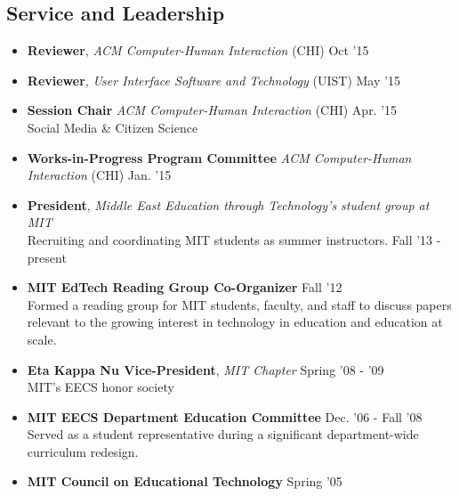 \documentclass[margin]{res}
\begin{document}
\begin{resume}
\section{Service and Leadership}

                \begin{itemize}[leftmargin=*] %
\item {\bf Reviewer}, {\it ACM Computer-Human Interaction} (CHI) \hfill Oct '15 
\item {\bf Reviewer}, {\it User Interface Software and Technology} (UIST) \hfill May '15 
\item {\bf Session Chair} {\it ACM Computer-Human Interaction} (CHI) \hfill Apr. '15 \\
Social Media \& Citizen Science
\item {\bf Works-in-Progress Program Committee} {\it ACM Computer-Human Interaction} (CHI)  \hfill Jan. '15 


\item {\bf President}, {\it Middle East Education through Technology's student group at MIT} \\ Recruiting and coordinating MIT students as summer instructors. \hfill Fall '13 - present %

		\item {\bf MIT EdTech Reading Group Co-Organizer} \hfill Fall '12 \\ Formed a reading group for MIT students, faculty, and staff to discuss papers relevant to the growing interest in technology in education and education at scale.

                \item {\bf Eta Kappa Nu Vice-President}, {\it MIT Chapter} \hfill Spring '08 - '09 \\ MIT's EECS honor society 


\item {\bf MIT EECS Department Education Committee} \hfill Dec. '06 - Fall '08 \\
Served as a student representative during a significant department-wide curriculum redesign.
\item {\bf MIT Council on Educational Technology} \hfill Spring '05 


 \end{itemize}
		 


          

		
		 



\end{resume}
\end{document}
